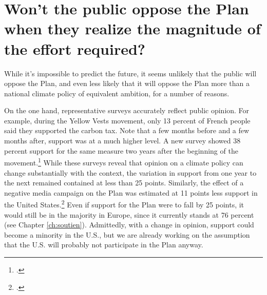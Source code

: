 \documentclass[a5paper,english,openany]{memoir}
\begin{document}
\section*{\normalsize Won't the public oppose the Plan when they realize %
the magnitude of the effort required?}\label{q:soutien} %

While it's impossible to predict the future, it seems unlikely that the public will oppose the Plan, and even less likely that it will oppose the Plan more than a national climate policy of equivalent ambition, for a number of reasons. 

On the one hand, representative surveys accurately reflect public opinion. 
For example, during the Yellow Vests movement, only 13 percent of French people said they supported the carbon tax. Note that a few months before and a few months after, support was at a much higher level. A new survey showed 38 percent support for the same measure two years after the beginning of the movement.\footnote{\citet{douenne_les_2020}.} While these surveys reveal that opinion on a climate policy can change substantially with the context, the variation in support from one year to the next remained contained at less than 25 points. Similarly, the effect of a negative media campaign on the Plan was estimated at 11 points less support in the United States.\footnote{\citet{fabre_international_2023}.} Even if support for the Plan were to fall by 25 points, it would still be in the majority in Europe, since it currently stands at 76 percent (see Chapter \ref{ch:soutien}). Admittedly, with a change in opinion, support could become a minority in the U.S., but we are already working on the assumption that the U.S. will probably not participate in the Plan anyway. %
\end{document}
